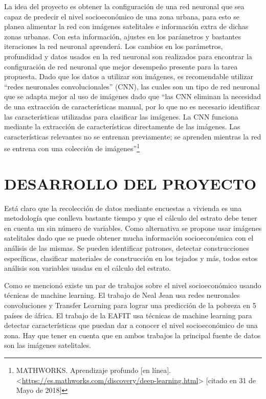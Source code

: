   La idea del proyecto es obtener la configuración de una red neuronal que sea capaz de predecir el nivel socioeconómico de una zona urbana, para esto se planea alimentar la red con imágenes satelitales e información extra de dichas zonas urbanas. Con esta información, ajustes en los parámetros y bastantes iteraciones la red neuronal aprenderá. Los cambios en los parámetros, profundidad y datos usados en la red neuronal son realizados para encontrar la configuración de red neuronal que mejor desempeño presente para la tarea propuesta. Dado que los datos a utilizar son imágenes, es recomendable utilizar “redes neuronales convolucionales” (CNN), las cuales son un tipo de red neuronal que se adapta mejor al uso de imágenes dado que “las CNN eliminan la necesidad de una extracción de características manual, por lo que no es necesario identificar las características utilizadas para clasificar las imágenes. La CNN funciona mediante la extracción de características directamente de las imágenes. Las características relevantes no se entrenan previamente; se aprenden mientras la red se entrena con una colección de imágenes”\footnote[12]{MATHWORKS. Aprendizaje profundo [en línea]. <\url{https://es.mathworks.com/discovery/deep-learning.html}> [citado en 31 de Mayo de 2018]}
  
 
\newpage\chapter{DESARROLLO DEL PROYECTO} 

Está claro que la recolección de datos mediante encuestas a vivienda es una metodología que conlleva bastante tiempo y que el cálculo del estrato debe tener en cuenta un sin número de variables. Como alternativa se propone usar imágenes satelitales dado que se puede obtener mucha información socioeconómica con el análisis de las mismas. Se pueden identificar patrones, detectar construcciones específicas, clasificar materiales de construcción en los tejados y más, todos estos análisis son variables usadas en el cálculo del estrato.
  
Como se mencionó existe un par de trabajos sobre el nivel socioeconómico usando técnicas de machine learning. El trabajo de Neal Jean usa redes neuronales convoluciones y Transfer Learning para lograr una predicción de la pobreza en 5 países de áfrica. El trabajo de la EAFIT usa técnicas de machine learning para detectar características que puedan dar a conocer el nivel socioeconómico de una zona. Hay que tener en cuenta que en ambos trabajos la principal fuente de datos son las imágenes satelitales.
 
